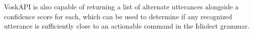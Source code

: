 \documentclass{article}
\theoremstyle{plain}
\theoremstyle{definition}
\theoremstyle{remark}
\begin{document}
VoskAPI is also capable of returning a list of alternate utterances alongside a confidence score for each, which can be used to determine if any recognized utterance is sufficiently close to an actionable command in the Idiolect grammar.

%
%
\end{document}
